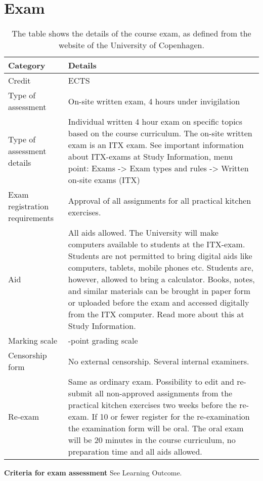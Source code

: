 \section{Exam}
\newpage
\begin{table}[t]
    \centering
    \caption{The table shows the details of the course exam, as defined from the website of the University of Copenhagen.}
    \label{tab:course_details}
    \begin{tabular}{ l | >{\raggedright\arraybackslash}p{\textwidth - 5.8cm} }
        \textbf{Category} & \textbf{Details} \\ 
        \hline
        Credit & 7.5 ECTS \\ 
        Type of assessment & On-site written exam, 4 hours under invigilation \\ 
        Type of assessment details & Individual written 4 hour exam on specific topics based on the course curriculum. The on-site written exam is an ITX exam. See important information about ITX-exams at Study Information, menu point: Exams -> Exam types and rules -> Written on-site exams (ITX) \\ 
        Exam registration requirements & Approval of all assignments for all practical kitchen exercises. \\ 
        Aid & All aids allowed. The University will make computers available to students at the ITX-exam. Students are not permitted to bring digital aids like computers, tablets, mobile phones etc. Students are, however, allowed to bring a calculator. Books, notes, and similar materials can be brought in paper form or uploaded before the exam and accessed digitally from the ITX computer. Read more about this at Study Information. \\ 
        Marking scale & 7-point grading scale \\ 
        Censorship form & No external censorship. Several internal examiners. \\ 
        Re-exam & Same as ordinary exam. Possibility to edit and re-submit all non-approved assignments from the practical kitchen exercises two weeks before the re-exam. If 10 or fewer register for the re-examination the examination form will be oral. The oral exam will be 20 minutes in the course curriculum, no preparation time and all aids allowed. \\ 
    \end{tabular}
\end{table}

\textbf{Criteria for exam assessment}
See Learning Outcome.